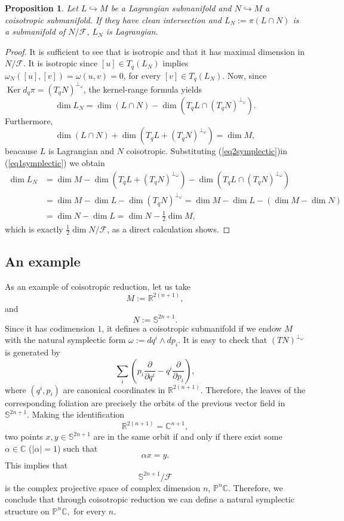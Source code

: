 \documentclass[12pt]{article}
\newtheorem{prop}{Proposition}[section]
\renewcommand{\dim}{\operatorname{dim}}
\renewcommand{\ker}{\operatorname{Ker}}
\newcommand{\partder}[2]{\frac{\partial #1}{\partial #2}}
\begin{document}
 \begin{prop} \label{LagrangianProjectionSymplectic} Let $L
\hookrightarrow M$ be a Lagrangian submanifold and $N \hookrightarrow M$ a coisotropic submanifold. If they have clean
intersection and $L_N:= \pi(L \cap N)$ is a submanifold of $N/\mathcal{F}$, $L_N$ is Lagrangian. \end{prop} \begin{proof} It is
sufficient to see that is isotropic and that it has maximal dimension in $N / \mathcal{F}$. It is isotropic since $[u] \in
T_q(L _ N)$ implies $\omega_N([u],[v]) = \omega(u,v) = 0$, for every $[v] \in T_q(L _ N)$. Now, since $\ker d_q\pi =
(T_qN)^{\perp_\omega}$, the kernel-range formula yields \begin{equation}\label{eq1symplectic} \dim L_N = \dim(L \cap N) - \dim (T_q L \cap (T_qN)^{\perp_\omega}). \end{equation} 
Furthermore, \begin{equation}\label{eq2symplectic} \dim(L \cap N) + \dim (T_qL + (T_qN)^{\perp_\omega}) = \dim M,
\end{equation} beacause $L$ is Lagrangian and $N$ coisotropic. Substituting (\ref{eq2symplectic})in (\ref{eq1symplectic}) we obtain \begin{align} \nonumber
\dim L_N &= \dim M - \dim (T_qL + (T_qN)^{\perp_\omega})- \dim (T_q L \cap (T_qN )^{\perp_\omega}) \\ & \nonumber = \dim M - \dim L - \dim (T_qN)^{\perp_\omega} = \dim M - \dim L -(\dim M - \dim N)\\ &\nonumber = \dim N - \dim L = \dim N - \frac{1}{2} \dim
M, \end{align} which is exactly $\frac{1}{2} \dim N/ \mathcal{F}$, as a direct calculation shows. \end{proof}

\subsection{An example}
As an example of coisotropic reduction, let us take $$M := \mathbb{R}^{2(n +1)},$$ and $$N := \mathbb{S}^{2n +1}.$$ Since it has codimension $1$, it defines a coisotropic submanifold if we endow $M$ with the natural symplectic form $\omega :=  d q^i \wedge  d p_i.$  It is easy to check that $(TN)^{\perp_\omega}$ is generated by $$ \sum_i \left(p_i \partder{}{q^i} - q^i \partder{}{p_i}\right),$$
where $(q^i, p_i)$ are canonical coordinates in $\mathbb{R}^{2(n +1)}$.
Therefore, the leaves of the corresponding foliation are precisely the orbits of the previous vector field in $\mathbb{S}^{2n +1}$. Making the identification $$\mathbb{
R}^{2(n +1)} = \mathbb{C}^{n +1},$$ two points $x, y \in \mathbb{S}^{2n +1}$ are in the same orbit if and only if there exist some $\alpha \in \mathbb{C}$ ($|\alpha| = 1$) such that $$\alpha x = y.$$ 
This implies that $$\mathbb{S}^{2n +1}/\mathcal{F}$$ is the complex projective space of complex dimension $n $, $\mathbb{P}^n \mathbb{C}$. Therefore, we conclude that through coisotropic reduction we can define a natural symplectic structure on $\mathbb{P}^n \mathbb{C},$ for every $n$.
\end{document}
